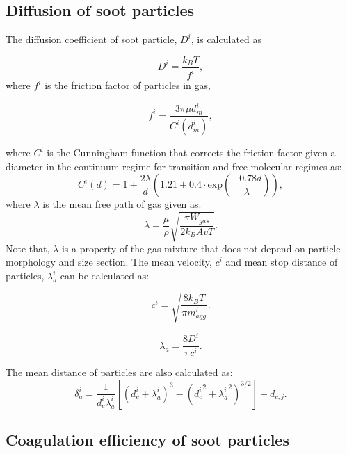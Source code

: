 \subsection{Diffusion of soot particles}

The diffusion coefficient of soot particle, $D^i$, is calculated as

\begin{equation}
	D^i = \frac{k_B T}{f^i}
	\label{eqn:diff},
\end{equation}
\noindent where $f^i$ is the friction factor of particles in gas,

\begin{equation}
	f^i = \frac{3\pi\mu d^i_m}{C^i(d^i_m)}
	\label{eqn:fraction},
\end{equation}

\noindent where ${C^i}$ is the Cunningham function that corrects the friction factor given a diameter in the continuum regime for transition and free molecular regimes as: 
\begin{equation}
	C^i(d) = 1+\frac{2\lambda}{d}
	\left(
	1.21+0.4\cdot\mathrm{exp}(\frac{-0.78d}{\lambda})
	\right)
	\label{eqn:cun},
\end{equation}
\noindent where $\lambda$ is the mean free path of gas given as:
\begin{equation}
	\lambda = \frac{\mu}{\rho}\sqrt{\frac{\pi W_{gas}}{2k_B Av T}}
	\label{eqn:lambda}.
\end{equation}
Note that, $\lambda$ is a property of the gas mixture that does not depend on particle morphology and size section. The mean velocity, ${c^i}$ and mean stop distance of particles, ${\lambda^i_a}$ can be calculated as:

\begin{equation}
	c^i = \sqrt{\frac{8k_B T}{\pi m^i_{agg}}}
	\label{eqn:meanvel}.
\end{equation}

\begin{equation}
	\lambda_a = \frac{8D^i}{\pi c^i}
	\label{eqn:stopdist}.
\end{equation}

The mean distance of particles are also calculated as:
\begin{equation}
	\delta^i_a=\frac{1}{d^i_c\lambda^i_a}
	\left[
		\left(
			d^i_c+\lambda^i_a
		\right)^3
		-\left(
			{d^i_c}^2+{\lambda^i_a}^2
		\right)^{3 / 2}
	\right]
	-d_{c, j}    
	\label{eqn:meandist}.
\end{equation}

\subsection{Coagulation efficiency of soot particles}
\label{sec:coageff}

